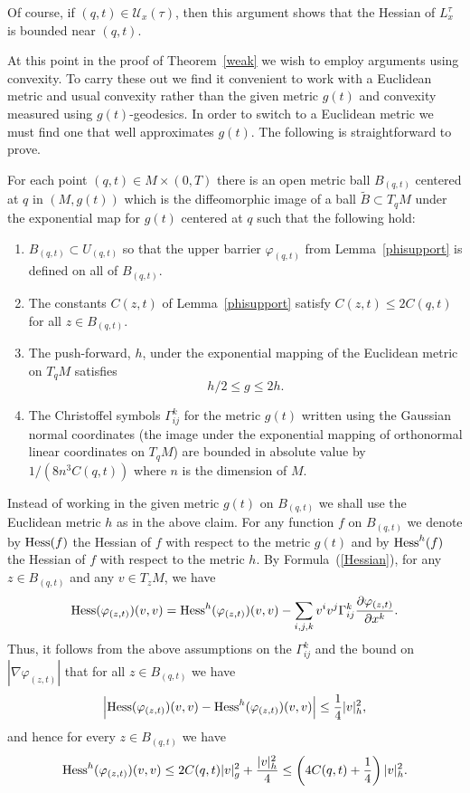 Of course, if $(q,t)\in {\mathcal U}_{x}(\tau)$, then this argument
shows that the Hessian of $L^\tau_{x}$ is bounded near $(q,t)$.


At this point in the proof of Theorem~\ref{weak} we wish to employ
arguments using convexity. To carry these out we find it convenient
to work with a Euclidean metric and usual convexity rather than the
given metric $g(t)$ and convexity measured using $g(t)$-geodesics.
In order to switch to a Euclidean metric we must find one that well
approximates $g(t)$. The following is straightforward to prove.

\begin{claim}
\label{claim:euclidean-approximating-ball}

For each point $(q,t)\in M\times(0,T)$ there is an open metric ball
$B_{(q,t)}$ centered at $q$ in $(M,g(t))$ which is the diffeomorphic
image of a ball $\widetilde B\subset T_qM$ under the exponential map
for $g(t)$ centered at $q$ such that the following hold:
\begin{enumerate}
\item $B_{(q,t)}\subset U_{(q,t)}$ so that the upper barrier $\varphi_{(q,t)}$
from Lemma~\ref{phisupport} is defined on all of $B_{(q,t)}$.
\item The constants $C(z,t)$ of Lemma~\ref{phisupport} satisfy
$C(z,t)\le 2C(q,t)$ for all $z\in B_{(q,t)}$.
\item The push-forward, $h$, under the exponential mapping of the Euclidean
metric on $T_qM$ satisfies $$h/2\le g\le 2h.$$
\item The Christoffel symbols $\Gamma_{ij}^k$ for the
metric $g(t)$ written using the Gaussian normal coordinates (the
image under the exponential mapping of orthonormal linear
coordinates on $T_qM$) are bounded in absolute value by
$1/(8n^3C(q,t))$ where $n$ is the dimension of $M$.
\end{enumerate}
\end{claim}

Instead of working in the given metric $g(t)$ on $B_{(q,t)}$ we
shall use the Euclidean metric $h$ as in the above claim. For any
function $f$ on $B_{(q,t)}$ we denote by $\operatorname{Hess}(f)$ the Hessian
of $f$ with respect to the metric $g(t)$ and by $\operatorname{Hess}^h(f)$
the Hessian of $f$ with respect to the metric $h$. By
Formula~(\ref{Hessian}), for any $z\in B_{(q,t)}$ and any $v\in
T_zM$, we have
$$\operatorname{Hess}(\varphi_{(z,t)})(v,v)=\operatorname{Hess}^h(\varphi_{(z,t)})(v,v)
-\sum_{i,j,k}v^iv^j\Gamma_{ij}^k\frac{\partial
\varphi_{(z,t)}}{\partial x^k}.$$ Thus, it follows from the above
assumptions on the $\Gamma_{ij}^k$ and the bound on $|\nabla
\varphi_{(z,t)}|$ that for all $z\in B_{(q,t)}$ we have
\begin{equation}\label{Hessdiff}
\left|\operatorname{Hess}(\varphi_{(z,t)})(v,v)-\operatorname{Hess}^h(\varphi_{(z,t)})(v,v)\right|\le
\frac{1}{4}|v|^2_h,\end{equation} and hence for every $z\in
B_{(q,t)}$ we have
$$\operatorname{Hess}^h(\varphi_{(z,t)})(v,v)\le 2C(q,t)|v|^2_g+\frac{|v|_h^2}{4}\le
\left(4C(q,t)+\frac{1}{4}\right)|v|_h^2.$$




